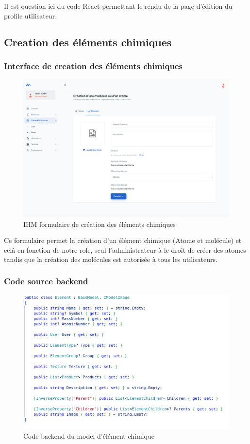 Il est question ici du code React permettant le rendu de la page d'édition du profile utilisateur.

\subsection{Creation des éléments chimiques}

\subsubsection{Interface de creation des éléments chimiques}

\begin{figure}[H]
	\centering
	\includegraphics[width=1\textwidth]{img/iec}
	\caption{IHM formulaire de création des éléments chimiques}
	\label{fig:mesh1}
\end{figure}

Ce formulaire permet la création d'un élément chimique (Atome et molécule) et celà en fonction de notre role, seul l'administrateur à le droit de créer des atomes tandis que la création des molécules est autorisée à tous les utilisateurs.

\subsubsection{Code source backend}

\begin{figure}[H]
	\centering
	\includegraphics[width=1\textwidth]{img/met}
	\caption{Code backend du model d'élément chimique}
	\label{fig:mesh1}
\end{figure}

